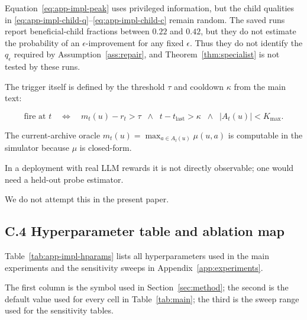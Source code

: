 \documentclass{article} %
\begin{document}
Equation~\eqref{eq:app-impl-peak} uses privileged information, but the child
qualities in \eqref{eq:app-impl-child-q}--\eqref{eq:app-impl-child-c} remain
random. The saved runs report beneficial-child fractions between \(0.22\) and
\(0.42\), but they do not estimate the probability of an
\(\epsilon\)-improvement for any fixed \(\epsilon\). Thus they do not identify
the \(q_\epsilon\) required by Assumption~\ref{ass:repair}, and
Theorem~\ref{thm:specialist} is not tested by these runs.

The trigger itself is defined by the threshold $\tau$ and cooldown $\kappa$ from the main text:

\begin{equation}
\label{eq:app-impl-trigger}
\text{fire at } t \quad\Longleftrightarrow\quad m_t(u) - r_t > \tau \;\;\wedge\;\; t - t_{\text{last}} > \kappa \;\;\wedge\;\; |A_t(u)| < K_{\max}.
\end{equation}

The current-archive oracle $m_t(u) = \max_{a \in A_t(u)} \mu(u, a)$ is computable in the simulator because $\mu$ is closed-form.

In a deployment with real LLM rewards it is not directly observable; one would need a held-out probe estimator.

We do not attempt this in the present paper.

\subsection{C.4 Hyperparameter table and ablation map}

\label{app:impl-hparams}

Table~\ref{tab:app-impl-hparams} lists all hyperparameters used in the main experiments and the sensitivity sweeps in Appendix~\ref{app:experiments}.

The first column is the symbol used in Section~\ref{sec:method}; the second is the default value used for every cell in Table~\ref{tab:main}; the third is the sweep range used for the sensitivity tables.
\end{document}
